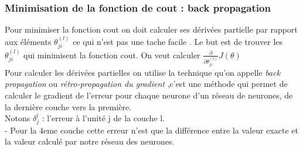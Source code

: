 \subsubsection{Minimisation de la fonction de cout : back propagation }
Pour minimiser la fonction cout on doit calculer ses dérivées partielle par rapport aux éléments ${\theta}_{ji}^{(l)}$ ce qui n'est pas une tache facile .
Le but est de trouver les ${\theta}_{ji}^{(l)}$ qui minimisent la fonction cout.
On veut calculer $\frac{\partial }{\partial {\theta}_{ji}^{(l)} }J\left({\theta }\right)$ \\
Pour calculer les dérivées partielles on utilise la technique qu'on appelle \emph{back propagation } ou \emph{rétro-propagation du gradient  } ,c'est une méthode qui permet de calculer le gradient de l'erreur pour chaque neurone d'un réseau de neurones, de la dernière couche vers la première.\\
Notons ${\delta}_{j}^{l}$ : l'erreur à l'unité j de la couche l. \\
- Pour la 4eme couche  cette erreur n'est que la différence entre la valeur exacte et la valeur calculé par notre réseau des neurones.

